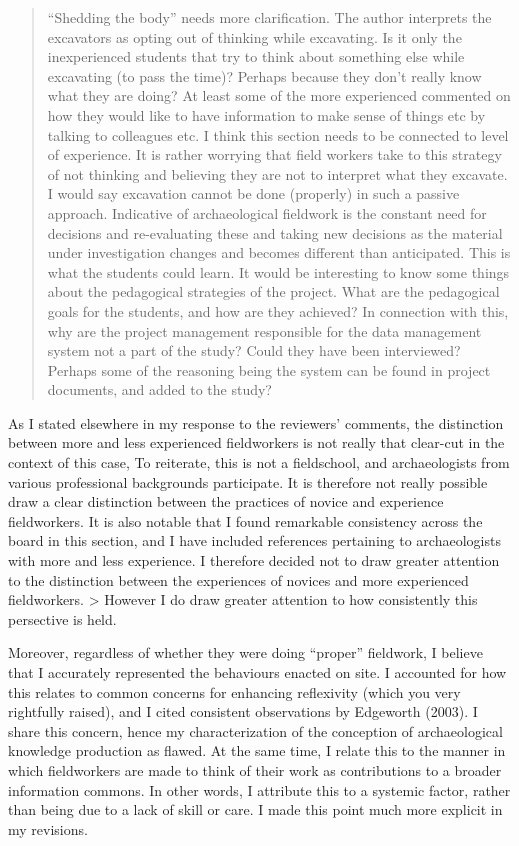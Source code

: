 \documentclass[
]{article}
\begin{document}
\begin{quote}
``Shedding the body'' needs more clarification. The author interprets
the excavators as opting out of thinking while excavating. Is it only
the inexperienced students that try to think about something else while
excavating (to pass the time)? Perhaps because they don't really know
what they are doing? At least some of the more experienced commented on
how they would like to have information to make sense of things etc by
talking to colleagues etc. I think this section needs to be connected to
level of experience. It is rather worrying that field workers take to
this strategy of not thinking and believing they are not to interpret
what they excavate. I would say excavation cannot be done (properly) in
such a passive approach. Indicative of archaeological fieldwork is the
constant need for decisions and re-evaluating these and taking new
decisions as the material under investigation changes and becomes
different than anticipated. This is what the students could learn. It
would be interesting to know some things about the pedagogical
strategies of the project. What are the pedagogical goals for the
students, and how are they achieved? In connection with this, why are
the project management responsible for the data management system not a
part of the study? Could they have been interviewed? Perhaps some of the
reasoning being the system can be found in project documents, and added
to the study?
\end{quote}

As I stated elsewhere in my response to the reviewers' comments, the
distinction between more and less experienced fieldworkers is not really
that clear-cut in the context of this case, To reiterate, this is not a
fieldschool, and archaeologists from various professional backgrounds
participate. It is therefore not really possible draw a clear
distinction between the practices of novice and experience fieldworkers.
It is also notable that I found remarkable consistency across the board
in this section, and I have included references pertaining to
archaeologists with more and less experience. I therefore decided not to
draw greater attention to the distinction between the experiences of
novices and more experienced fieldworkers. \textgreater{} However I do
draw greater attention to how consistently this persective is held.

Moreover, regardless of whether they were doing ``proper'' fieldwork, I
believe that I accurately represented the behaviours enacted on site. I
accounted for how this relates to common concerns for enhancing
reflexivity (which you very rightfully raised), and I cited consistent
observations by Edgeworth (2003). I share this concern, hence my
characterization of the conception of archaeological knowledge
production as flawed. At the same time, I relate this to the manner in
which fieldworkers are made to think of their work as contributions to a
broader information commons. In other words, I attribute this to a
systemic factor, rather than being due to a lack of skill or care. I
made this point much more explicit in my revisions.
\end{document}
